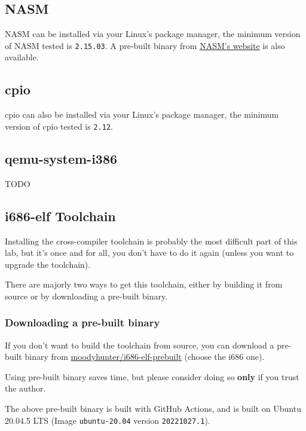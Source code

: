 \subsection{NASM} \label{sec:nasm-install}

NASM can be installed via your Linux's package manager, the minimum version of NASM tested is \texttt{2.15.03}.
A pre-built binary from \href{https://www.nasm.us}{NASM's website} is also available.

\subsection{cpio} \label{sec:cpio-install}

cpio can also be installed via your Linux's package manager, the minimum version of cpio tested is \texttt{2.12}.

\subsection{qemu-system-i386} \label{sec:qemu-install}

TODO

\subsection{i686-elf Toolchain} \label{sec:cross-compiler-install}

Installing the cross-compiler toolchain is probably the most difficult part of this lab, but it's
once and for all, you don't have to do it again (unless you want to upgrade the toolchain).

There are majorly two ways to get this toolchain, either by building it from source or by downloading
a pre-built binary.

\subsubsection{Downloading a pre-built binary}

If you don't want to build the toolchain from source, you can download a pre-built
binary from \href{https://github.com/moodyhunter/i686-elf-prebuilt/releases}{moodyhunter/i686-elf-prebuilt} (choose the i686 one).

\begin{warning}
    \item Using pre-built binary saves time, but please consider doing so \textbf{only} if you trust the author.
    \item The above pre-built binary is built with GitHub Actions, and is built on Ubuntu 20.04.5 LTS (Image \texttt{ubuntu-20.04} version \texttt{20221027.1}).
\end{warning}

